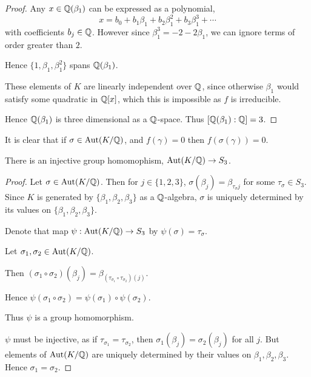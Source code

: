 \documentclass{unswmaths}
\begin{document}
\begin{proof}
    Any $x \in \mathbb{Q}(\beta_1)$
    can be expressed as a polynomial,
    \begin{equation*}
        x = b_0+b_1\beta_1+b_2\beta_1^2+b_3\beta_1^3+\cdots
    \end{equation*}
    with coefficients $b_j \in \mathbb{Q}$.
    However since $\beta_1^3 = -2-2\beta_1$,
    we can ignore terms of order greater than $2$.
    
    Hence $\{1,\beta_1,\beta_1^2\}$
    spans $\mathbb{Q}(\beta_1)$.
    
    These elements of $K$ are linearly independent over $\mathbb{Q}$,
    since otherwise $\beta_1$ would satisfy some quadratic
    in $\mathbb{Q}[x]$, which this is impossible as $f$ is irreducible.
    
    Hence $\mathbb{Q}(\beta_1)$ is three dimensional as a $\mathbb{Q}$-space.
    Thus $[\mathbb{Q}(\beta_1):\mathbb{Q}] = 3$.
\end{proof}


It is clear that if $\sigma \in \operatorname{Aut}(K/\mathbb{Q})$, and $f(\gamma) = 0$
then $f(\sigma(\gamma)) = 0$.
\begin{theorem}
\label{injection}
    There is an injective group homomophism, $\operatorname{Aut}(K/\mathbb{Q})\rightarrow S_3$.
\end{theorem}
\begin{proof}
    Let $\sigma \in \operatorname{Aut}(K/\mathbb{Q})$. Then for $j \in \{1,2,3\}$,
    $\sigma(\beta_j) = \beta_{\tau_\sigma{j}}$ for some $\tau_\sigma \in S_3$.
    Since $K$ is generated by $\{\beta_1,\beta_2,\beta_3\}$
    as a $\mathbb{Q}$-algebra, $\sigma$ is uniquely determined by its
    values on $\{\beta_1,\beta_2,\beta_3\}$.
    
    Denote that map $\psi:\operatorname{Aut}(K/\mathbb{Q})\rightarrow S_3$
    by $\psi(\sigma) = \tau_\sigma$.
    
    Let $\sigma_1,\sigma_2 \in \operatorname{Aut}(K/\mathbb{Q})$. 
    
    Then $(\sigma_1\circ \sigma_2)(\beta_j) = \beta_{(\tau_{\sigma_1}\circ\tau_{\sigma_2})(j)}$.
    
    Hence $\psi(\sigma_1\circ\sigma_2) = \psi(\sigma_1)\circ\psi(\sigma_2)$.
    
    Thus $\psi$ is a group homomorphism.
    
    $\psi$ must be injective, as if $\tau_{\sigma_{1}} = \tau_{\sigma_2}$, 
    then $\sigma_1(\beta_j) = \sigma_2(\beta_j)$ for all $j$.
    But elements of $\operatorname{Aut}(K/\mathbb{Q})$ are uniquely determined by their values
    on $\beta_1,\beta_2,\beta_3$. Hence $\sigma_1 = \sigma_2$.
\end{proof}
\end{document}
